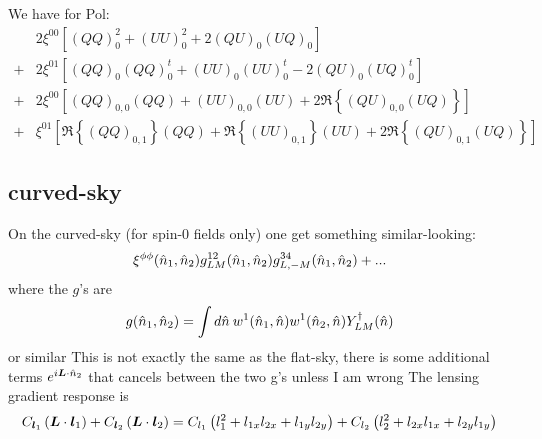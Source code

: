 \documentclass[11pt]{article}
\begin{document}
\newcommand{\real}[1]{ \Re {\left\{#1\right\}}}
We have for Pol:
\begin{equation}
\boxed{
\begin{split}
	&2 \xi^{00} \left[ \left(QQ\right)_0^2 + \left(UU\right)_0^2 + 2\left(QU\right)_0\left(UQ\right)_0 \right] \\+ &2 \xi^{01}\left[ \left(QQ\right)_0\left(QQ\right)^t_0  + \left(UU\right)_0\left(UU\right)^t_0-2\left(QU\right)_0\left(UQ\right)^t_0 \right] \\
	+& 2\xi^{00} \left[ (QQ)_{0,0}(QQ)  + (UU)_{0,0}(UU) + 2  \Re\left\{(QU)_{0,0}(UQ)\right\}\right] \\ +& \xi^{01} \left[ \real{(QQ)_{0,1}}(QQ)  + \real{(UU)_{0,1}}(UU) + 2  \real{(QU)_{0,1}(UQ)}\right]
\end{split}}
\end{equation}


\subsection{curved-sky}
On the curved-sky (for spin-0 fields only) one get something similar-looking:
\begin{equation}
\xi^{\phi\phi}({\hat n}_1,{\hat n}_2) g^{12}_{LM}({\hat n}_1,{\hat n}_2) g^{34}_{L,-M}({\hat n}_1,{\hat n}_2) + ...
\end{equation}
where the $g$'s are
\begin{equation}
	g({\hat n}_1, {\hat n}_2) = \int d{\hat n} \:w^1({\hat n}_1, {\hat n})w^1({\hat n}_2, {\hat n}) Y^\dagger_{LM}({\hat n})
\end{equation}
or similar
\color{red} This is not exactly the same as the flat-sky, there is some additional terms $e^{i \boldsymbol{L} \cdot {\hat n}_2}$ that cancels between the two g's unless I am wrong
\color{black}
The lensing gradient response is
\begin{equation}
	C_{\boldsymbol{l}_1} \left( \boldsymbol{L} \cdot \boldsymbol{l}_1 \right) + C_{\boldsymbol{l}_2} \left( \boldsymbol{L} \cdot \boldsymbol{l}_2 \right) = C_{l_1}\left( l_1^2  + l_{1x} l_{2x} + l_{1y} l_{2y}\right) + C_{l_2}\left( l_2^2  + l_{2x} l_{1x} + l_{2y} l_{1y}\right)
\end{equation}
\end{document}
